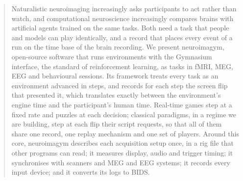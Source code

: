 \begin{abstract}
Naturalistic neuroimaging increasingly asks participants to act rather than watch, and computational neuroscience increasingly compares brains with artificial agents trained on the same tasks.
Both need a task that people and models can play identically, and a record that places every event of a run on the time base of the brain recording.
We present neuroimagym, open-source software that runs environments with the Gymnasium interface, the standard of reinforcement learning, as tasks in fMRI, MEG, EEG and behavioural sessions.
Its framework treats every task as an environment advanced in steps, and records for each step the screen flip that presented it, which translates exactly between the environment's engine time and the participant's human time.
Real-time games step at a fixed rate and puzzles at each decision; classical paradigms, in a regime we are building, step at each flip their script requests, so that all of them share one record, one replay mechanism and one set of players.
Around this core, neuroimagym describes each acquisition setup once, in a rig file that other programs can read; it measures display, audio and trigger timing; it synchronises with scanners and MEG and EEG systems; it records every input device; and it converts its logs to BIDS.
\end{abstract}
